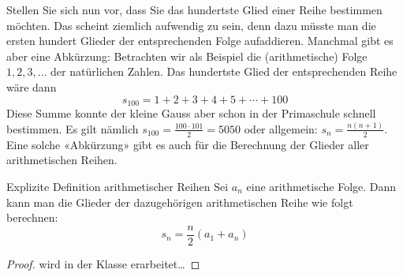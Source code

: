 
Stellen Sie sich nun vor, dass Sie das hundertste Glied einer Reihe bestimmen möchten. Das scheint ziemlich aufwendig zu sein, denn dazu müsste man die ersten hundert Glieder der entsprechenden Folge aufaddieren. Manchmal gibt es aber eine Abkürzung: Betrachten wir als Beispiel die (arithmetische) Folge $1,2,3,\dots$ der natürlichen Zahlen. Das hundertste Glied der entsprechenden Reihe wäre dann
$$ s_{100}=1+2+3+4+5+\cdots +100 $$
Diese Summe konnte der kleine Gauss aber schon in der Primaschule schnell bestimmen. Es gilt nämlich $s_{100}=\frac{100\cdot 101}{2}=5050$ oder allgemein: $s_n= \frac{n(n+1)}{2}$.
Eine solche «Abkürzung» gibt es auch für die Berechnung der Glieder aller arithmetischen Reihen.

\begin{satz}{Explizite Definition arithmetischer Reihen}{}
    Sei $a_n$ eine arithmetische Folge. 
Dann kann man die Glieder der dazugehörigen arithmetischen Reihe wie folgt berechnen:  
$$ s_n= \frac{n}{2}  (a_1+a_n )$$
\end{satz}
\begin{proof}
    wird in der Klasse erarbeitet\dots
    \vfill
\end{proof}


